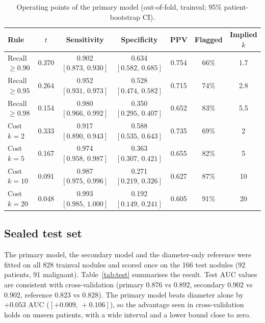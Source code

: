 \documentclass[journal]{IEEEtran}
\newcommand{\auc}{\mathrm{AUC}}
\newcommand{\ci}[2]{[#1,\,#2]}            %
\begin{document}
\begin{table}[!t]
\caption{Operating points of the primary model (out-of-fold, trainval; 95\% patient-bootstrap CI).}
\label{tab:threshold}
\centering\small
\begin{tabular}{lcccccc}
\toprule
Rule & $t$ & Sensitivity & Specificity & PPV & Flagged & Implied $k$\\
\midrule
Recall $\geq 0.90$ & 0.370 & 0.902 $\ci{0.873}{0.930}$ & 0.634 $\ci{0.582}{0.685}$ & 0.754 & 66\% & 1.7\\
Recall $\geq 0.95$ & 0.264 & 0.952 $\ci{0.931}{0.973}$ & 0.528 $\ci{0.474}{0.582}$ & 0.715 & 74\% & 2.8\\
Recall $\geq 0.98$ & 0.154 & 0.980 $\ci{0.966}{0.992}$ & 0.350 $\ci{0.295}{0.407}$ & 0.652 & 83\% & 5.5\\
Cost $k=2$         & 0.333 & 0.917 $\ci{0.890}{0.943}$ & 0.588 $\ci{0.535}{0.643}$ & 0.735 & 69\% & 2\\
Cost $k=5$         & 0.167 & 0.974 $\ci{0.958}{0.987}$ & 0.363 $\ci{0.307}{0.421}$ & 0.655 & 82\% & 5\\
Cost $k=10$        & 0.091 & 0.987 $\ci{0.975}{0.996}$ & 0.271 $\ci{0.219}{0.326}$ & 0.627 & 87\% & 10\\
Cost $k=20$        & 0.048 & 0.993 $\ci{0.985}{1.000}$ & 0.192 $\ci{0.149}{0.241}$ & 0.605 & 91\% & 20\\
\bottomrule
\end{tabular}
\end{table}

\subsection{Sealed test set}
\label{sec:test}
The primary model, the secondary model and the diameter-only reference were fitted on all 828 trainval nodules and
scored once on the 166 test nodules (92 patients, 91 malignant). Table~\ref{tab:test} summarises the result.
Test $\auc$ values are consistent with cross-validation (primary 0.876 vs 0.892, secondary 0.902 vs 0.902, reference 0.823 vs
0.828). The primary model beats diameter alone by $+0.053$ $\auc$ ($\ci{+0.009}{+0.106}$), so the advantage seen in cross-validation holds on
unseen patients, with a wide interval and a lower bound close to zero.
\end{document}
